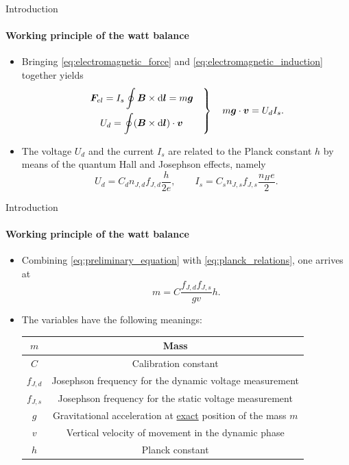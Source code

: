 \documentclass{beamer}
\begin{document}
\begin{frame}[allowframebreaks]{Introduction}
\framesubtitle{Working principle of the watt balance}
\begin{itemize}
    \item Bringing \cref{eq:electromagnetic_force} and \cref{eq:electromagnetic_induction} together yields
    \begin{equation}\label{eq:preliminary_equation}
    \left.
    \begin{aligned}
    \bm{F}_{el} = I_s\oint\bm{B}&\times \mathrm{d}\bm{l} = m\bm{g}  \\
    U_d = \oint (\bm{B}&\times \mathrm{d}\bm{l})\cdot \bm{v}
    \end{aligned}  \quad \right\} \quad  m\bm{g}\cdot\bm{v} = U_dI_s.
\end{equation}
\item The voltage $U_d$ and the current $I_s$ are related to the Planck constant $h$ by means of the quantum Hall and Josephson effects, namely \begin{equation}\label{eq:planck_relations}
    U_d = C_dn_{J,d}f_{J,d}\frac{h}{2e}, \qquad I_s = C_sn_{J,s}f_{J,s}\frac{n_He}{2}.
\end{equation}
\end{itemize}
\end{frame}

\begin{frame}[allowframebreaks]{Introduction}
\framesubtitle{Working principle of the watt balance}
\begin{itemize}
    \item Combining \cref{eq:preliminary_equation} with \cref{eq:planck_relations}, one arrives at
    \begin{equation}
        m = C\frac{f_{J,d} f_{J,s}}{gv}h.
    \end{equation}
    \item The variables have the following meanings:
    \begin{table}
        \centering
    \footnotesize
    \begin{tabular}{|c|c|}
    \hline
    $m$ & Mass \\
    \hline
    $C$ & Calibration constant \\
    \hline
    $f_{J,d}$ & Josephson frequency for the dynamic voltage measurement \\
    \hline
    $f_{J,s}$ & Josephson frequency for the static voltage measurement \\
    \hline
    $g$ & Gravitational acceleration at \underline{exact} position of the mass $m$ \\
    \hline
    $v$ & Vertical velocity of movement in the dynamic phase \\
    \hline
    $h$ & Planck constant \\
    \hline
    \end{tabular}
    \end{table}
\end{itemize}
\end{frame}
\end{document}
